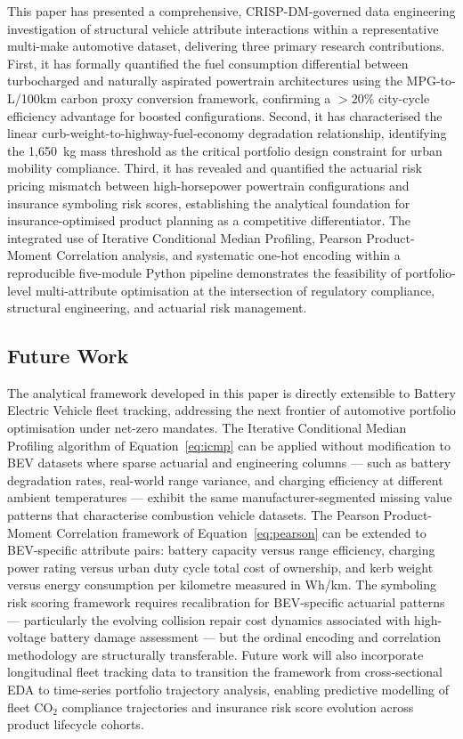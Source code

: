 \documentclass[conference]{IEEEtran}
\begin{document}
This paper has presented a comprehensive, CRISP-DM-governed
data engineering investigation of structural vehicle attribute
interactions within a representative multi-make automotive dataset,
delivering three primary research contributions. First, it has
formally quantified the fuel consumption differential between
turbocharged and naturally aspirated powertrain architectures
using the MPG-to-L/100km carbon proxy conversion framework,
confirming a $>20\%$ city-cycle efficiency advantage for boosted
configurations. Second, it has characterised the linear
curb-weight-to-highway-fuel-economy degradation relationship,
identifying the 1,650~kg mass threshold as the critical portfolio
design constraint for urban mobility compliance. Third, it has
revealed and quantified the actuarial risk pricing mismatch
between high-horsepower powertrain configurations and insurance
symboling risk scores, establishing the analytical foundation
for insurance-optimised product planning as a competitive
differentiator. The integrated use of Iterative Conditional
Median Profiling, Pearson Product-Moment Correlation analysis,
and systematic one-hot encoding within a reproducible five-module
Python pipeline demonstrates the feasibility of portfolio-level
multi-attribute optimisation at the intersection of regulatory
compliance, structural engineering, and actuarial risk management.

\subsection{Future Work}

The analytical framework developed in this paper is directly
extensible to Battery Electric Vehicle fleet tracking, addressing
the next frontier of automotive portfolio optimisation under
net-zero mandates. The Iterative Conditional Median Profiling
algorithm of Equation~\eqref{eq:icmp} can be applied without
modification to BEV datasets where sparse actuarial and engineering
columns — such as battery degradation rates, real-world range
variance, and charging efficiency at different ambient temperatures
— exhibit the same manufacturer-segmented missing value patterns
that characterise combustion vehicle datasets. The Pearson
Product-Moment Correlation framework of Equation~\eqref{eq:pearson}
can be extended to BEV-specific attribute pairs: battery capacity
versus range efficiency, charging power rating versus urban duty
cycle total cost of ownership, and kerb weight versus energy
consumption per kilometre measured in Wh/km. The symboling risk
scoring framework requires recalibration for BEV-specific actuarial
patterns — particularly the evolving collision repair cost dynamics
associated with high-voltage battery damage assessment — but the
ordinal encoding and correlation methodology are structurally
transferable. Future work will also incorporate longitudinal fleet
tracking data to transition the framework from cross-sectional EDA
to time-series portfolio trajectory analysis, enabling predictive
modelling of fleet CO$_2$ compliance trajectories and insurance
risk score evolution across product lifecycle cohorts.
\end{document}
